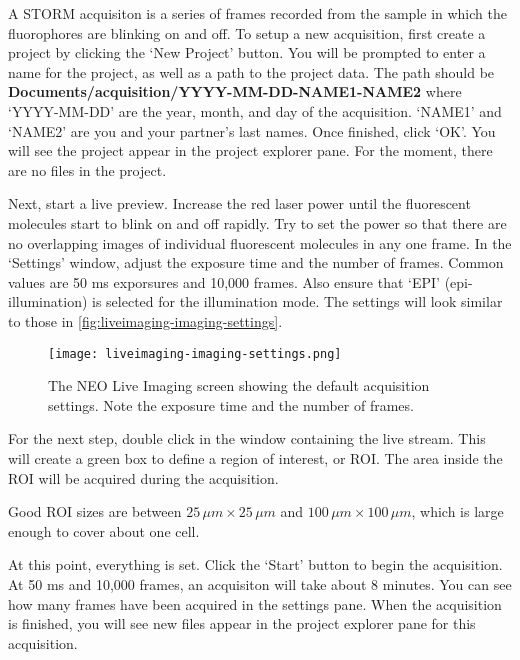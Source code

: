 \documentclass[10pt,a4paper,oneside]{book}
\begin{document}
A STORM acquisiton is a series of frames recorded from the sample in which the fluorophores are blinking on and off. To setup a new acquisition, first create a project by clicking the `New Project' button. You will be prompted to enter a name for the project, as well as a path to the project data. The path should be \textbf{Documents/acquisition/YYYY-MM-DD-NAME1-NAME2} where `YYYY-MM-DD' are the year, month, and day of the acquisition. `NAME1' and `NAME2' are you and your partner's last names. Once finished, click `OK'. You will see the project appear in the project explorer pane. For the moment, there are no files in the project.

Next, start a live preview. Increase the red laser power until the fluorescent molecules start to blink on and off rapidly. Try to set the power so that there are no overlapping images of individual fluorescent molecules in any one frame. In the `Settings' window, adjust the exposure time and the number of frames. Common values are 50 ms exporsures and 10,000 frames. Also ensure that `EPI' (epi-illumination) is selected for the illumination mode. The settings will look similar to those in \autoref{fig:liveimaging-imaging-settings}.

\begin{figure}[ht]
    \centering
    \texttt{[image: liveimaging-imaging-settings.png]}
    \caption{The NEO Live Imaging screen showing the default acquisition settings. Note the exposure time and the number of frames.}
    \label{fig:liveimaging-imaging-settings}
\end{figure}

For the next step, double click in the window containing the live stream. This will create a green box to define a region of interest, or ROI. The area inside the ROI will be acquired during the acquisition.

\newline

Good ROI sizes are between $25 \, \mu m\times 25 \, \mu m$ and $100 \, \mu m\times 100 \, \mu m$, which is large enough to cover about one cell.

At this point, everything is set. Click the `Start' button to begin the acquisition. At 50 ms and 10,000 frames, an acquisiton will take about 8 minutes. You can see how many frames have been acquired in the settings pane. When the acquisition is finished, you will see new files appear in the project explorer pane for this acquisition.
\end{document}

